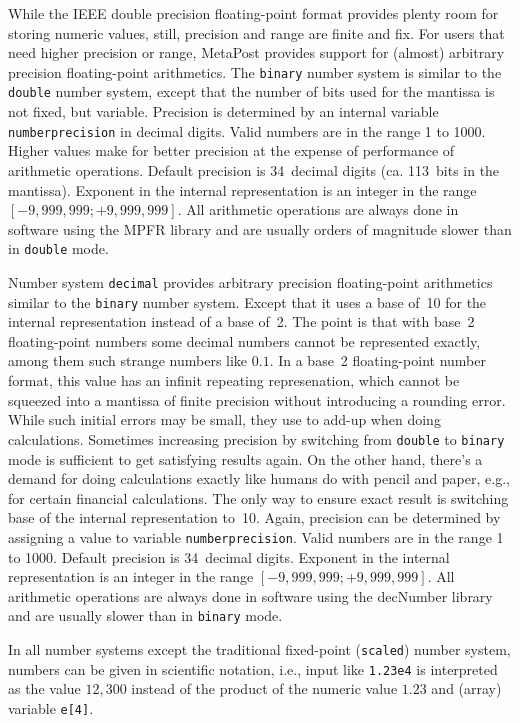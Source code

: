 While the IEEE double precision floating-point format provides plenty
room for storing numeric values, still, precision and range are finite
and fix.  For users that need higher precision or range, MetaPost
provides support for (almost) arbitrary precision floating-point
arithmetics.  The \texttt{binary} number
system is similar to the \texttt{double} number system, except that the
number of bits used for the mantissa is not fixed, but variable.
Precision is determined by an internal variable
\texttt{numberprecision}\label{Dnumberprecision}
in decimal digits.  Valid numbers are in the range 1 to 1000.  Higher
values make for better precision at the expense of performance of
arithmetic operations.  Default precision is 34~decimal digits
(ca. 113~bits in the mantissa).  Exponent in the internal representation
is an integer in the range $[-9,999,999; +9,999,999]$.  All arithmetic
operations are always done in software using the MPFR library
\cite{lib:mpfr} and are usually orders of magnitude slower than in
\texttt{double} mode.

Number system \texttt{decimal} provides
arbitrary precision floating-point arithmetics similar to the
\texttt{binary} number system.  Except that it uses a base of~10 for the
internal representation instead of a base of~2.  The point is that with
base~2 floating-point numbers some decimal numbers cannot be represented
exactly, among them such strange numbers like $0.1$.  In a base~2
floating-point number format, this value has an infinit repeating
represenation, which cannot be squeezed into a mantissa of finite
precision without introducing a rounding error.  While such initial
errors may be small, they use to add-up when doing calculations.
Sometimes increasing precision by switching from \texttt{double} to
\texttt{binary} mode is sufficient to get satisfying results again.  On
the other hand, there's a demand for doing calculations exactly like
humans do with pencil and paper, e.g., for certain financial
calculations.  The only way to ensure exact result is switching base of
the internal representation to~10.  Again, precision can be determined
by assigning a value to variable
\texttt{numberprecision}.
Valid numbers are in the range 1 to 1000.  Default precision is
34~decimal digits.  Exponent in the internal representation is an
integer in the range $[-9,999,999; +9,999,999]$.  All arithmetic
operations are always done in software using the decNumber library
\cite{lib:decnumber} and are usually slower than in \texttt{binary}
mode.

In all number systems except the traditional fixed-point
(\texttt{scaled}) number system, numbers can be given in scientific
notation, i.e., input like \texttt{1.23e4} is interpreted as the value
$12,300$ instead of the product of the numeric value $1.23$ and (array)
variable \verb|e[4]|.



